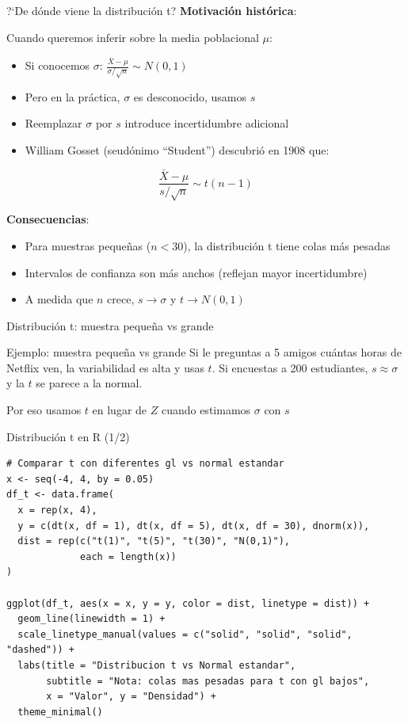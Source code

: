 \documentclass[aspectratio=169, 11pt]{beamer}
\begin{document}
\begin{frame}{?`De d\'onde viene la distribuci\'on t?}
\textbf{Motivaci\'on hist\'orica}:

Cuando queremos inferir sobre la media poblacional $\mu$:
\begin{itemize}
\item Si conocemos $\sigma$: $\frac{\bar{X} - \mu}{\sigma/\sqrt{n}} \sim N(0,1)$
\item Pero en la pr\'actica, $\sigma$ es desconocido, usamos $s$
\item Reemplazar $\sigma$ por $s$ introduce incertidumbre adicional
\item William Gosset (seud\'onimo ``Student'') descubri\'o en 1908 que:
\end{itemize}

\[
\frac{\bar{X} - \mu}{s/\sqrt{n}} \sim t(n-1)
\]

\textbf{Consecuencias}:
\begin{itemize}
\item Para muestras peque\~nas ($n < 30$), la distribuci\'on t tiene colas m\'as pesadas
\item Intervalos de confianza son m\'as anchos (reflejan mayor incertidumbre)
\item A medida que $n$ crece, $s \to \sigma$ y $t \to N(0,1)$
\end{itemize}
\end{frame}

\begin{frame}{Distribuci\'on t: muestra peque\~na vs grande}
\begin{alertblock}{Ejemplo: muestra peque\~na vs grande}
Si le preguntas a 5 amigos cu\'antas horas de Netflix ven, la variabilidad es alta y usas $t$. Si encuestas a 200 estudiantes, $s \approx \sigma$ y la $t$ se parece a la normal.
\end{alertblock}

\vspace{0.5em}
\alert{Por eso usamos $t$ en lugar de $Z$ cuando estimamos $\sigma$ con $s$}
\end{frame}

\begin{frame}[fragile]{Distribución t en R (1/2)}
\begin{lstlisting}
# Comparar t con diferentes gl vs normal estandar
x <- seq(-4, 4, by = 0.05)
df_t <- data.frame(
  x = rep(x, 4),
  y = c(dt(x, df = 1), dt(x, df = 5), dt(x, df = 30), dnorm(x)),
  dist = rep(c("t(1)", "t(5)", "t(30)", "N(0,1)"),
             each = length(x))
)

ggplot(df_t, aes(x = x, y = y, color = dist, linetype = dist)) +
  geom_line(linewidth = 1) +
  scale_linetype_manual(values = c("solid", "solid", "solid", "dashed")) +
  labs(title = "Distribucion t vs Normal estandar",
       subtitle = "Nota: colas mas pesadas para t con gl bajos",
       x = "Valor", y = "Densidad") +
  theme_minimal()
\end{lstlisting}
\end{frame}
\end{document}
